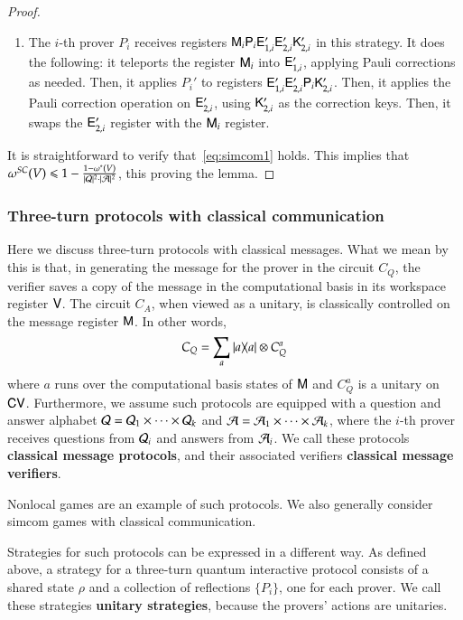 \begin{proof}
\begin{enumerate}
		\item The $i$-th prover $P_i$ receives registers ${\mathsf{M}}_i {\mathsf{P}}_i {\mathsf{E}}_{1,i}' {\mathsf{E}}_{2,i}' {\mathsf{K}}_{2,i}'$ in this strategy. It does the following: it teleports the register ${\mathsf{M}}_i$ into ${\mathsf{E}}_{1,i}'$, applying Pauli corrections as needed. Then, it applies $P_i'$ to registers ${\mathsf{E}}_{1,i}' {\mathsf{E}}_{2,i}' {\mathsf{P}}_i {\mathsf{K}}_{2,i}'$. Then, it applies the Pauli correction operation on ${\mathsf{E}}_{2,i}'$, using ${\mathsf{K}}_{2,i}'$ as the correction keys. Then, it swaps the ${\mathsf{E}}_{2,i}'$ register with the ${\mathsf{M}}_i$ register. 
	\end{enumerate}
	It is straightforward to verify that~\eqref{eq:simcom1} holds.  This implies that $\omega^{SC}(V) \leqslant 1 - \frac{1 - \omega^*(V)}{|\mathcal Q|^2 \cdot |\mathcal A|^2}$, this proving the lemma.
\end{proof}


\subsubsection{Three-turn protocols with classical communication}


Here we discuss three-turn protocols with classical messages. What we mean by this is that, in generating the message for the prover in the circuit $C_Q$, the verifier saves a copy of the message in the computational basis in its workspace register ${\mathsf{V}}$. The circuit $C_A$, when viewed as a unitary, is classically controlled on the message register ${\mathsf{M}}$. In other words, 
\[
	C_Q = \sum_{a} |a\rangle\! \langle a| \otimes C_Q^a 
\]
where $a$ runs over the computational basis states of ${\mathsf{M}}$ and $C_Q^a$ is a unitary on ${\mathsf{C}} {\mathsf{V}}$. Furthermore, we assume such protocols are equipped with a question and answer alphabet $\mathcal Q = \mathcal Q_1 \times \cdots \times \mathcal Q_k$ and $\mathcal A = \mathcal A_1 \times \cdots \times \mathcal A_k$, where the $i$-th prover receives questions from $\mathcal Q_i$ and answers from $\mathcal A_i$. We call these protocols \textbf{classical message protocols}, and their associated verifiers \textbf{classical message verifiers}.

Nonlocal games are an example of such protocols. We also generally consider simcom games with classical communication. 

Strategies for such protocols can be expressed in a different way. As defined above, a strategy for a three-turn quantum interactive protocol consists of a shared state $\rho$ and a collection of reflections $\{ P_i \}$, one for each prover. We call these strategies \textbf{unitary strategies}, because the provers' actions are unitaries.

